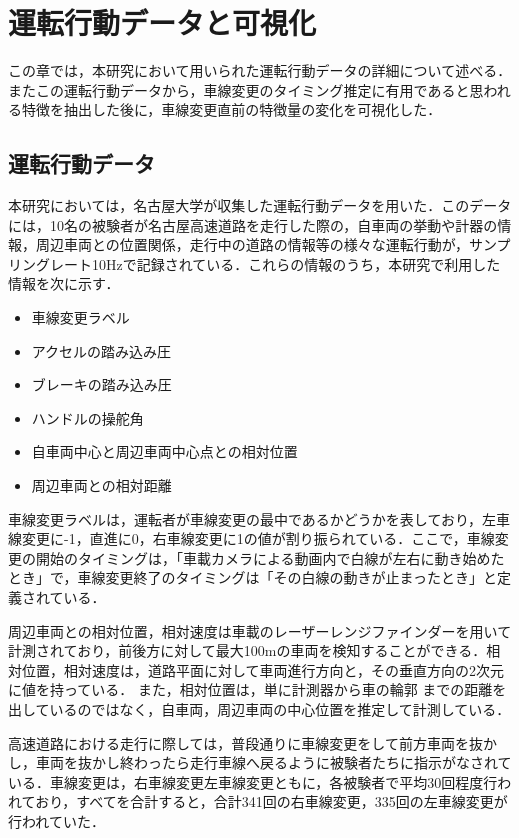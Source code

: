 \chapter{運転行動データと可視化}
この章では，本研究において用いられた運転行動データの詳細について述べる．またこの運転行動データから，車線変更のタイミング推定に有用であると思われる特徴を抽出した後に，車線変更直前の特徴量の変化を可視化した．
\section{運転行動データ}
本研究においては，名古屋大学が収集した運転行動データを用いた．このデータには，10名の被験者が名古屋高速道路を走行した際の，自車両の挙動や計器の情報，周辺車両との位置関係，走行中の道路の情報等の様々な運転行動が，サンプリングレート10Hzで記録されている．これらの情報のうち，本研究で利用した情報を次に示す．
\begin{itemize}
 \item 車線変更ラベル
 \item アクセルの踏み込み圧
 \item ブレーキの踏み込み圧
 \item ハンドルの操舵角
 \item 自車両中心と周辺車両中心点との相対位置
 \item 周辺車両との相対距離
\end{itemize}
\par
車線変更ラベルは，運転者が車線変更の最中であるかどうかを表しており，左車線変更に-1，直進に0，右車線変更に1の値が割り振られている．ここで，車線変更の開始のタイミングは，「車載カメラによる動画内で白線が左右に動き始めたとき」で，車線変更終了のタイミングは「その白線の動きが止まったとき」と定義されている．
\par
周辺車両との相対位置，相対速度は車載のレーザーレンジファインダーを用いて計測されており，前後方に対して最大100mの車両を検知することができる．相対位置，相対速度は，道路平面に対して車両進行方向と，その垂直方向の2次元に値を持っている．%
また，相対位置は，単に計測器から車の輪郭%
までの距離を出しているのではなく，自車両，周辺車両の中心位置を推定して計測している．
\par
高速道路における走行に際しては，普段通りに車線変更をして前方車両を抜かし，車両を抜かし終わったら走行車線へ戻るように被験者たちに指示がなされている．車線変更は，右車線変更左車線変更ともに，各被験者で平均30回程度行われており，すべてを合計すると，合計341回の右車線変更，335回の左車線変更が行われていた．
